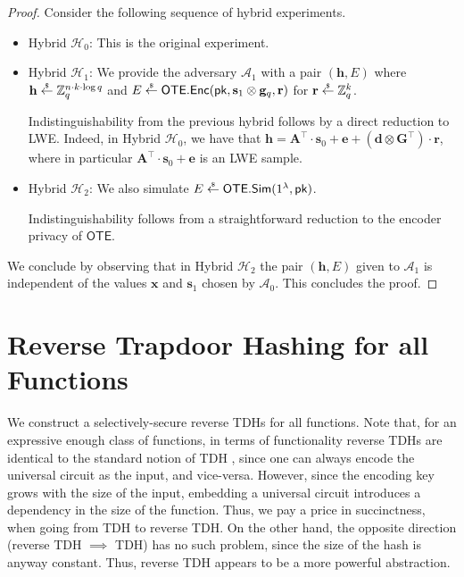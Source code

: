 \documentclass{article}
\newcommand{\getsr}{\overset{\raisebox{-1pt}{$\scriptscriptstyle \$$}}{\gets}}
\newcommand{\sample}{\getsr}
\newcommand{\OTE}{\mathsf{OTE}}
\newcommand{\Z}{\mathbb{Z}}
\renewcommand{\sec}{\ensuremath{\lambda}}
\newcommand{\Sim}{\mathsf{Sim}}
\newcommand{\Adv}{\mathcal{A}}
\newcommand{\algofont}[1]{\ensuremath{\mathsf{#1}}}
\newcommand{\Enc}{{\algofont{Enc}}}
\newcommand{\pk}{{\mathsf{pk}}}
\newcommand\bbbone{1}
\begin{document}
\begin{proof}
Consider the following sequence of hybrid experiments.
\begin{itemize}
    \item Hybrid $\mathcal{H}_0$: This is the original experiment.
    \item Hybrid $\mathcal{H}_1$: We provide the adversary $\Adv_1$ with a pair $(\mathbf{h}, E)$ where $\mathbf{h}\sample\Z_q^{n\cdot k\cdot \log q}$ and $E\sample \OTE.\Enc(\pk, \mathbf{s}_1\otimes \mathbf{g}_q, \mathbf{r})$ for $\mathbf{r}\sample\Z_q^k$.

    Indistinguishability from the previous hybrid follows by a direct reduction to LWE. Indeed, in Hybrid $\mathcal{H}_0$, we have that $\mathbf{h} =\mathbf{A}^\intercal\cdot \mathbf{s}_0+\mathbf{e}+(\mathbf{d}\otimes\mathbf{G}^\intercal)\cdot \mathbf{r}$, where in particular $\mathbf{A}^\intercal\cdot \mathbf{s}_0+\mathbf{e}$ is an LWE sample.
    
    \item Hybrid $\mathcal{H}_2$: We also simulate $E\sample \OTE.\Sim(\bbbone^\sec, \pk)$.

    Indistinguishability follows from a straightforward reduction to the encoder privacy of $\OTE$.
\end{itemize}
We conclude by observing that in Hybrid $\mathcal{H}_2$ the pair $(\mathbf{h}, E)$ given to $\Adv_1$ is independent of the values $\mathbf{x}$ and $\mathbf{s}_1$ chosen by $\Adv_0$. This concludes the proof.
\end{proof}

\section{Reverse Trapdoor Hashing for all Functions}\label{sec:rtdh}

We construct a selectively-secure reverse TDHs for all functions. Note that, for an expressive enough class of functions, in terms of functionality reverse TDHs are identical to the standard notion of TDH \cite{C:DGIMMO19}, since one can always encode the universal circuit as the input, and vice-versa.
However, since the encoding key grows with the size of the input, embedding a universal circuit introduces a dependency in the size of the function. Thus, we pay a price in succinctness, when going from TDH to reverse TDH. On the other hand, the opposite direction (reverse TDH $\implies$ TDH) has no such problem, since the size of the hash is anyway constant. Thus, reverse TDH appears to be a more powerful abstraction.
\end{document}

